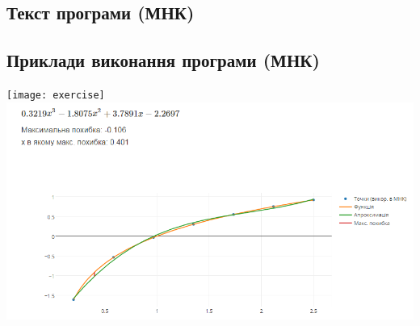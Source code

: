 \documentclass[ukrainian,14pt]{extarticle}
\begin{document}
\newpage
\subsection{Текст програми (МНК)}


\newpage
\subsection{Приклади виконання програми (МНК)}
\texttt{[image: exercise]}
\\


\includegraphics[scale=0.75]{res}
\end{document}
